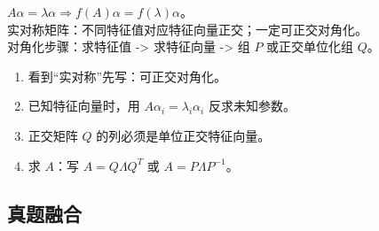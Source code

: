 ﻿\documentclass[11pt,a4paper,UTF8]{ctexart}
\begin{document}
\begin{identifybox}[高亮公式]
$A\alpha=\lambda\alpha\Rightarrow f(A)\alpha=f(\lambda)\alpha$。\\
实对称矩阵：不同特征值对应特征向量正交；一定可正交对角化。\\
对角化步骤：求特征值 -> 求特征向量 -> 组 $P$ 或正交单位化组 $Q$。\\
\end{identifybox}

\begin{templatebox}[考场模板]

\begin{enumerate}
\item 看到“实对称”先写：可正交对角化。
\item 已知特征向量时，用 $A\alpha_i=\lambda_i\alpha_i$ 反求未知参数。
\item 正交矩阵 $Q$ 的列必须是单位正交特征向量。
\item 求 $A$：写 $A=Q\Lambda Q^T$ 或 $A=P\Lambda P^{-1}$。
\end{enumerate}

\end{templatebox}
\subsection{真题融合}
\end{document}
